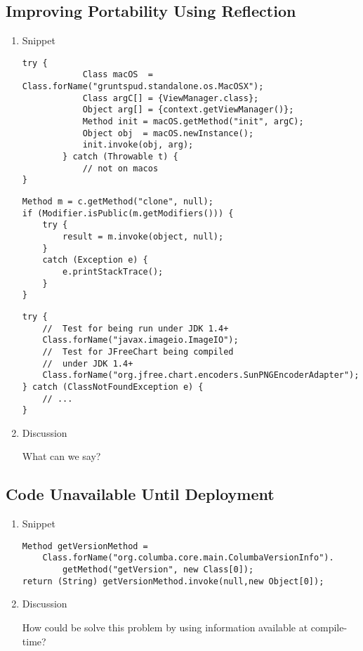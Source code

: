 \documentclass{usiinfdocprop}
\begin{document}
\subsection{Improving Portability Using Reflection}
\label{sec:org0f49425}
\begin{enumerate}
\item Snippet
\label{sec:orgd92a66f}

\lstset{language=java,label= ,caption= ,captionpos=b,numbers=none}
\begin{lstlisting}
try {
            Class macOS  = Class.forName("gruntspud.standalone.os.MacOSX");
            Class argC[] = {ViewManager.class};
            Object arg[] = {context.getViewManager()};
            Method init = macOS.getMethod("init", argC);
            Object obj  = macOS.newInstance();
            init.invoke(obj, arg);
        } catch (Throwable t) {
            // not on macos
}
\end{lstlisting}

\lstset{language=java,label= ,caption= ,captionpos=b,numbers=none}
\begin{lstlisting}
Method m = c.getMethod("clone", null);
if (Modifier.isPublic(m.getModifiers())) {
    try {
        result = m.invoke(object, null);
    }
    catch (Exception e) {
        e.printStackTrace();
    }
}
\end{lstlisting}

\lstset{language=java,label= ,caption= ,captionpos=b,numbers=none}
\begin{lstlisting}
try {
    //  Test for being run under JDK 1.4+
    Class.forName("javax.imageio.ImageIO");
    //  Test for JFreeChart being compiled
    //  under JDK 1.4+
    Class.forName("org.jfree.chart.encoders.SunPNGEncoderAdapter");
} catch (ClassNotFoundException e) {
    // ...
}
\end{lstlisting}
\item Discussion
\label{sec:orgf0ba08f}

What can we say?
\end{enumerate}

\subsection{Code Unavailable Until Deployment}
\label{sec:org77b88d3}
\begin{enumerate}
\item Snippet
\label{sec:org7eed6e8}

\lstset{language=java,label= ,caption= ,captionpos=b,numbers=none}
\begin{lstlisting}
Method getVersionMethod =
    Class.forName("org.columba.core.main.ColumbaVersionInfo").
        getMethod("getVersion", new Class[0]);
return (String) getVersionMethod.invoke(null,new Object[0]);
\end{lstlisting}

\item Discussion
\label{sec:org2ddceda}

How could be solve this problem by using information available
at compile-time?
\end{enumerate}
\end{document}
